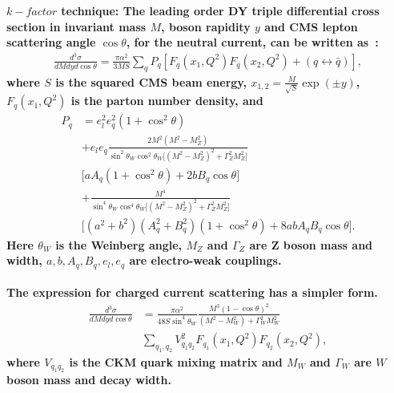 \begin{description}
\item \bf {$k-factor$ technique:} \rm
The leading order DY triple differential cross section in
invariant mass \(M\), boson rapidity \(y\) and CMS
lepton scattering angle \(\cos\theta\), for the neutral current, 
can be written as~\cite{Drell:1970wh,Yamada:1981mw}:
\begin{align}
 \textstyle
 \frac{d^3\sigma}{dM{d}y d\cos\theta} =  
 \frac{\pi\alpha^2}{3MS}\sum_{q}P_q \left[F_q(x_1,Q^2)F_{\bar{q}}(x_2,Q^2) 
 + (q\leftrightarrow\bar{q})\right],
\end{align}
where \(S\) is the squared CMS beam energy, \(x_{1,2} = \frac{M}{\sqrt{S}}\exp(\pm y)\), $F_q(x_1,Q^2)$ 
is the parton number density, and 
\begin{align}
  P_q &=  e_l^2e_q^2(1+\cos^2\theta) \nonumber \\
      &+  e_le_q\frac{2M^2(M^2-M_Z^2)}{\sin^2\theta_W\cos^2\theta_W
          \big[(M^2-M_Z^2)^2+\Gamma_Z^2M_Z^2\big]} \nonumber \\
      &    \big[aA_q(1+\cos^2\theta)+2bB_q\cos\theta\big] \nonumber \\
      &+  \frac{M^4}{\sin^4\theta_W\cos^4\theta_W
          \big[(M^2-M_Z^2)^2+\Gamma_Z^2M_Z^2\big]} \nonumber \\
      &    \big[(a^2+b^2)(A_q^2+B_q^2)(1+\cos^2\theta)+8abA_qB_q\cos\theta\big].
\end{align}
Here \(\theta_W\) is the Weinberg angle, \(M_Z\) and \(\Gamma_Z\) are Z boson mass and 
width, $a, b, A_q, B_q, e_l, e_q$ are electro-weak couplings.
\\
\\
The expression for charged current scattering has a simpler form.
\begin{align}
\frac{d^3\sigma}{dMdyd\cos\theta} &=
 \frac{\pi\alpha^2}{48S\sin^4\theta_W}
 \frac{M^3(1-\cos\theta)^2}{(M^2-M_W^2)+\Gamma_W^2M_W^2}  \nonumber \\
 & \sum_{q_1,q_2}V_{q_1q_2}^2F_{q_1}(x_1,Q^2)F_{q_2}(x_2,Q^2),
\end{align}
where \(V_{q_1q_2}\) is the CKM quark mixing matrix and \(M_W\) and \(\Gamma_W\)
are \(W\) boson mass and decay width.


\end{description}
